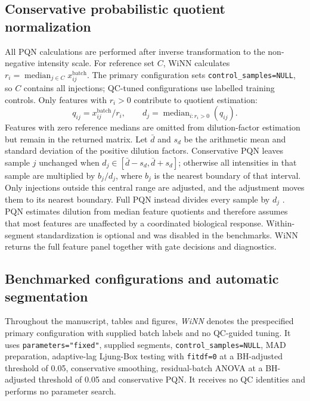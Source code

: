 \documentclass[namedate,webpdf,modern,large,nocrop]{oup-authoring-template}
\begin{document}
\subsection{Conservative probabilistic quotient normalization}

All PQN calculations are performed after inverse transformation to the non-negative intensity scale. For reference set \(C\), WiNN calculates \(r_i=\operatorname{median}_{j\in C}x_{ij}^{\mathrm{batch}}\). The primary configuration sets \texttt{control\_samples=NULL}, so \(C\) contains all injections; QC-tuned configurations use labelled training controls. Only features with \(r_i>0\) contribute to quotient estimation:
\[
q_{ij}=x_{ij}^{\mathrm{batch}}/r_i,\qquad d_j=\operatorname{median}_{i:r_i>0}(q_{ij}).
\]
Features with zero reference medians are omitted from dilution-factor estimation but remain in the returned matrix. Let \(\bar d\) and \(s_d\) be the arithmetic mean and standard deviation of the positive dilution factors. Conservative PQN leaves sample \(j\) unchanged when \(d_j\in[\bar d-s_d,\bar d+s_d]\); otherwise all intensities in that sample are multiplied by \(b_j/d_j\), where \(b_j\) is the nearest boundary of that interval. Only injections outside this central range are adjusted, and the adjustment moves them to its nearest boundary. Full PQN instead divides every sample by \(d_j\) \citep{Dieterle2006PQN}. PQN estimates dilution from median feature quotients and therefore assumes that most features are unaffected by a coordinated biological response. Within-segment standardization is optional and was disabled in the benchmarks. WiNN returns the full feature panel together with gate decisions and diagnostics.

\subsection{Benchmarked configurations and automatic segmentation}

Throughout the manuscript, tables and figures, \emph{WiNN} denotes the prespecified primary configuration with supplied batch labels and no QC-guided tuning. It uses \texttt{parameters="fixed"}, supplied segments, \texttt{control\_samples=NULL}, MAD preparation, adaptive-lag Ljung-Box testing with \texttt{fitdf=0} at a BH-adjusted threshold of 0.05, conservative smoothing, residual-batch ANOVA at a BH-adjusted threshold of 0.05 and conservative PQN. It receives no QC identities and performs no parameter search.
\end{document}
